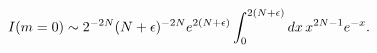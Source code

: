 \begin{equation}
\label{Eq_A23}
I(m=0) \sim 2^{-2N} (N + \epsilon)^{-2N} e^{2(N+\epsilon)}\\
  \int^{2(N+\epsilon)}_0 dx \, x^{2N-1} e^{-x}.
\end{equation}

